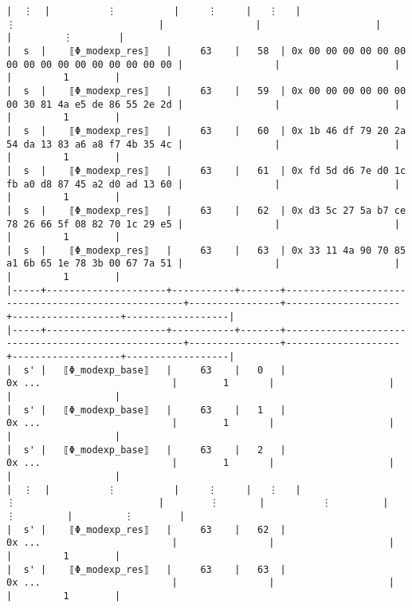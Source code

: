 \documentclass[varwidth=\maxdimen,margin=0.5cm,multi={verbatim}]{standalone}
\begin{document}
\begin{verbatim}
|  ⋮  |          ⋮          |     ⋮     |   ⋮   |                          ⋮                         |                |                    |                   |         ⋮        |
|  s  |    ⟦Φ_modexp_res⟧   |     63    |   58  | 0x 00 00 00 00 00 00 00 00 00 00 00 00 00 00 00 00 |                |                    |                   |         1        |
|  s  |    ⟦Φ_modexp_res⟧   |     63    |   59  | 0x 00 00 00 00 00 00 00 30 81 4a e5 de 86 55 2e 2d |                |                    |                   |         1        |
|  s  |    ⟦Φ_modexp_res⟧   |     63    |   60  | 0x 1b 46 df 79 20 2a 54 da 13 83 a6 a8 f7 4b 35 4c |                |                    |                   |         1        |
|  s  |    ⟦Φ_modexp_res⟧   |     63    |   61  | 0x fd 5d d6 7e d0 1c fb a0 d8 87 45 a2 d0 ad 13 60 |                |                    |                   |         1        |
|  s  |    ⟦Φ_modexp_res⟧   |     63    |   62  | 0x d3 5c 27 5a b7 ce 78 26 66 5f 08 82 70 1c 29 e5 |                |                    |                   |         1        |
|  s  |    ⟦Φ_modexp_res⟧   |     63    |   63  | 0x 33 11 4a 90 70 85 a1 6b 65 1e 78 3b 00 67 7a 51 |                |                    |                   |         1        |
|-----+---------------------+-----------+-------+----------------------------------------------------+----------------+--------------------+-------------------+------------------|
|-----+---------------------+-----------+-------+----------------------------------------------------+----------------+--------------------+-------------------+------------------|
|  s' |   ⟦Φ_modexp_base⟧   |     63    |   0   |                       0x ...                       |        1       |                    |                   |                  |
|  s' |   ⟦Φ_modexp_base⟧   |     63    |   1   |                       0x ...                       |        1       |                    |                   |                  |
|  s' |   ⟦Φ_modexp_base⟧   |     63    |   2   |                       0x ...                       |        1       |                    |                   |                  |
|  ⋮  |          ⋮          |     ⋮     |   ⋮   |                          ⋮                         |        ⋮       |          ⋮         |         ⋮         |         ⋮        |
|  s' |    ⟦Φ_modexp_res⟧   |     63    |   62  |                       0x ...                       |                |                    |                   |         1        |
|  s' |    ⟦Φ_modexp_res⟧   |     63    |   63  |                       0x ...                       |                |                    |                   |         1        |

\end{verbatim}
\end{document}
